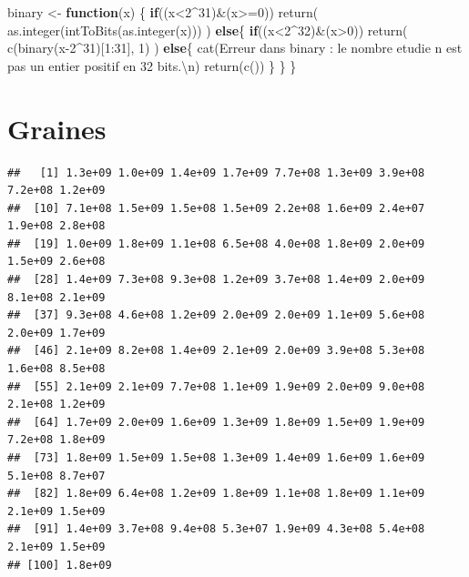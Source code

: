 \documentclass[
]{article}
\newenvironment{Shaded}{\begin{snugshade}}{\end{snugshade}}
\newcommand{\ControlFlowTok}[1]{\textcolor[rgb]{0.13,0.29,0.53}{\textbf{#1}}}
\newcommand{\DecValTok}[1]{\textcolor[rgb]{0.00,0.00,0.81}{#1}}
\newcommand{\FunctionTok}[1]{\textcolor[rgb]{0.00,0.00,0.00}{#1}}
\newcommand{\NormalTok}[1]{#1}
\newcommand{\OtherTok}[1]{\textcolor[rgb]{0.56,0.35,0.01}{#1}}
\newcommand{\SpecialCharTok}[1]{\textcolor[rgb]{0.00,0.00,0.00}{#1}}
\newcommand{\StringTok}[1]{\textcolor[rgb]{0.31,0.60,0.02}{#1}}
\begin{document}
\begin{Shaded}
\begin{Highlighting}[]
\NormalTok{binary }\OtherTok{\textless{}{-}} \ControlFlowTok{function}\NormalTok{(x)}
\NormalTok{\{}
  \ControlFlowTok{if}\NormalTok{((x}\SpecialCharTok{\textless{}}\DecValTok{2}\SpecialCharTok{\^{}}\DecValTok{31}\NormalTok{)}\SpecialCharTok{\&}\NormalTok{(x}\SpecialCharTok{\textgreater{}=}\DecValTok{0}\NormalTok{))}
    \FunctionTok{return}\NormalTok{( }\FunctionTok{as.integer}\NormalTok{(}\FunctionTok{intToBits}\NormalTok{(}\FunctionTok{as.integer}\NormalTok{(x))) )}
  \ControlFlowTok{else}\NormalTok{\{}
    \ControlFlowTok{if}\NormalTok{((x}\SpecialCharTok{\textless{}}\DecValTok{2}\SpecialCharTok{\^{}}\DecValTok{32}\NormalTok{)}\SpecialCharTok{\&}\NormalTok{(x}\SpecialCharTok{\textgreater{}}\DecValTok{0}\NormalTok{))}
      \FunctionTok{return}\NormalTok{( }\FunctionTok{c}\NormalTok{(}\FunctionTok{binary}\NormalTok{(x}\DecValTok{{-}2}\SpecialCharTok{\^{}}\DecValTok{31}\NormalTok{)[}\DecValTok{1}\SpecialCharTok{:}\DecValTok{31}\NormalTok{], }\DecValTok{1}\NormalTok{) )}
    \ControlFlowTok{else}\NormalTok{\{}
      \FunctionTok{cat}\NormalTok{(}\StringTok{\textquotesingle{}Erreur dans binary : le nombre etudie n est pas un entier positif en 32 bits.}\SpecialCharTok{\textbackslash{}n}\StringTok{\textquotesingle{}}\NormalTok{)}
      \FunctionTok{return}\NormalTok{(}\FunctionTok{c}\NormalTok{())}
\NormalTok{    \}}
\NormalTok{  \}}
\NormalTok{\}}
\end{Highlighting}
\end{Shaded}

\section*{Graines}

\begin{verbatim}
##   [1] 1.3e+09 1.0e+09 1.4e+09 1.7e+09 7.7e+08 1.3e+09 3.9e+08 7.2e+08 1.2e+09
##  [10] 7.1e+08 1.5e+09 1.5e+08 1.5e+09 2.2e+08 1.6e+09 2.4e+07 1.9e+08 2.8e+08
##  [19] 1.0e+09 1.8e+09 1.1e+08 6.5e+08 4.0e+08 1.8e+09 2.0e+09 1.5e+09 2.6e+08
##  [28] 1.4e+09 7.3e+08 9.3e+08 1.2e+09 3.7e+08 1.4e+09 2.0e+09 8.1e+08 2.1e+09
##  [37] 9.3e+08 4.6e+08 1.2e+09 2.0e+09 2.0e+09 1.1e+09 5.6e+08 2.0e+09 1.7e+09
##  [46] 2.1e+09 8.2e+08 1.4e+09 2.1e+09 2.0e+09 3.9e+08 5.3e+08 1.6e+08 8.5e+08
##  [55] 2.1e+09 2.1e+09 7.7e+08 1.1e+09 1.9e+09 2.0e+09 9.0e+08 2.1e+08 1.2e+09
##  [64] 1.7e+09 2.0e+09 1.6e+09 1.3e+09 1.8e+09 1.5e+09 1.9e+09 7.2e+08 1.8e+09
##  [73] 1.8e+09 1.5e+09 1.5e+08 1.3e+09 1.4e+09 1.6e+09 1.6e+09 5.1e+08 8.7e+07
##  [82] 1.8e+09 6.4e+08 1.2e+09 1.8e+09 1.1e+08 1.8e+09 1.1e+09 2.1e+09 1.5e+09
##  [91] 1.4e+09 3.7e+08 9.4e+08 5.3e+07 1.9e+09 4.3e+08 5.4e+08 2.1e+09 1.5e+09
## [100] 1.8e+09
\end{verbatim}
\end{document}
